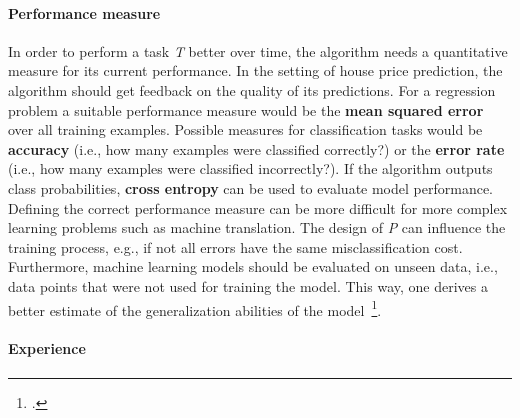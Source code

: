 \paragraph{Performance measure}

In order to perform a task \textit{T} better over time, the algorithm needs
a quantitative measure for its current performance. In the setting of
house price prediction, the algorithm should get feedback on the quality of its
predictions. For a regression problem a suitable performance measure would be 
the \textbf{mean squared error} over all training examples. Possible measures
for classification tasks would be \textbf{accuracy} (i.e., how many examples
were classified correctly?) or the \textbf{error rate} (i.e., how many
examples were classified incorrectly?). If the algorithm outputs class 
probabilities, \textbf{cross entropy} can be used to evaluate model
performance. Defining the correct performance measure can be more difficult
for more complex learning problems such as machine translation. The design of 
\textit{P} can influence the training process, e.g., if not all errors have the
same misclassification cost. Furthermore, machine learning models should be evaluated on unseen
data, i.e., data points that were not used for training the model. This way,
one derives a better estimate of the generalization abilities of the model~\footcite{Bishop2006, Goodfellow2016, Mitchell1997}.

\paragraph{Experience}


